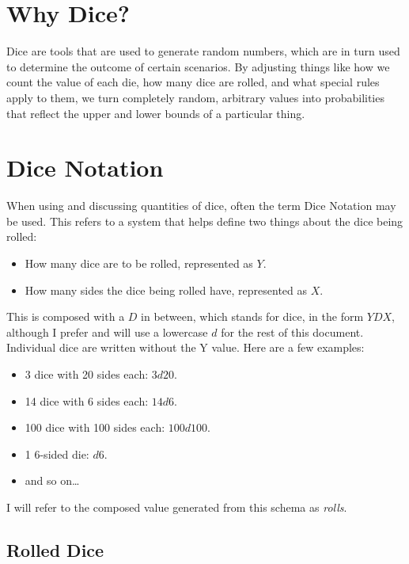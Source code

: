 \documentclass[../main.tex]{subfiles}
\begin{document}
    \section{Why Dice?}

    Dice are tools that are used to generate random numbers, which are in turn used to determine the outcome of certain scenarios. By adjusting things like how we count the value of each die, how many dice are rolled, and what special rules apply to them, we turn completely random, arbitrary values into probabilities that reflect the upper and lower bounds of a particular thing.

    \section{Dice Notation}

    When using and discussing quantities of dice, often the term Dice Notation may be used. This refers to a system that helps define two things about the dice being rolled:

    \begin{itemize}
        \item How many dice are to be rolled, represented as $Y$.
        \item How many sides the dice being rolled have, represented as $X$.
    \end{itemize}

    This is composed with a $D$ in between, which stands for dice, in the form $YDX$, although I prefer and will use a lowercase $d$ for the rest of this document. Individual dice are written without the Y value. Here are a few examples:

    \begin{itemize}
        \item 3 dice with 20 sides each: $3d20$.
        \item 14 dice with 6 sides each: $14d6$.
        \item 100 dice with 100 sides each: $100d100$.
        \item 1 6-sided die: $d6$.
        \item and so on\dots
    \end{itemize}

    I will refer to the composed value generated from this schema as {\em rolls}.

    \subsection{Rolled Dice}
\end{document}
